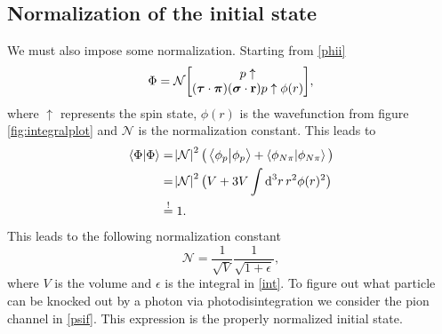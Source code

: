 \subsection{Normalization of the initial state}\label{subsec:initial}
We must also impose some normalization. Starting from \eqref{phii}
\begin{align}
    \Phi = \mathcal{N} \mqty[p\uparrow \\ (\vec{\tau}\cdot \vec{\pi})(\vec{\sigma}\cdot \vec{r})p\uparrow \phi(r)],
\end{align}
where $\uparrow$ represents the spin state, $\phi(r)$ is the wavefunction from figure  \ref{fig:integralplot} and $\mathcal{N}$ is the normalization constant.
This leads to
\begin{align}
    \braket{\Phi}{\Phi} &= \abs{\mathcal{N}}^2 \big( \braket{\phi_p}{\phi_p}+ \braket{\phi_{N\pi}}{\phi_{N\pi}} \big) \\
    &= \abs{\mathcal{N}}^2 \big( V+3V\int \text{d}^3r \, r^2 \phi(r)^2 \big)\label{int} \\
    &\stackrel{!}{=} 1.
\end{align} 
This leads to the following normalization constant
\begin{equation}
    \mathcal{N} = \frac{1}{\sqrt{V}}\frac{1}{\sqrt{1+\epsilon}},
\end{equation}
where $V$ is the volume and $\epsilon$ is the integral in \eqref{int}. To figure out what particle can be knocked out by a photon via photodisintegration we consider the pion channel in \eqref{psif}. 
This expression is the properly normalized initial state.
